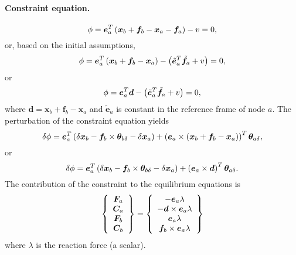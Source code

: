 \documentclass[10pt,fleqn,subeqn]{report}
\newcommand{\T}[1]{\bm{#1}}
\begin{document}
\paragraph{Constraint equation.}
\begin{equation}
	\phi = \T{e}_a^T \plbr{\T{x}_b + \T{f}_b - \T{x}_a - \T{f}_a} - v = 0 ,
\end{equation}
or, based on the initial assumptions,
\begin{equation}
	\phi = \T{e}_a^T \plbr{\T{x}_b + \T{f}_b - \T{x}_a}
		- \plbr{\tilde{\T{e}}_a^T \tilde{\T{f}}_a + v} = 0 ,
\end{equation}
or
\begin{equation}
	\phi = \T{e}_a^T \T{d}
		- \plbr{\tilde{\T{e}}_a^T \tilde{\T{f}}_a + v} = 0 ,
\end{equation}
where $\T{d}=\T{x}_b + \T{f}_b - \T{x}_a$ 
and $\tilde{\T{e}}_a$ is constant in the reference frame of node $a$.
The perturbation of the constraint equation yields
\begin{equation}
	\delta\phi = 
		\T{e}_a^T \plbr{\delta\T{x}_b
		- \T{f}_b\times\T{\theta}_{b\delta}
		- \delta\T{x}_a
		} + \plbr{\T{e}_a \times \plbr{
			\T{x}_b + \T{f}_b - \T{x}_a
		}}^T \T{\theta}_{a\delta} ,
\end{equation}
or
\begin{equation}
	\delta\phi = 
		\T{e}_a^T \plbr{\delta\T{x}_b
		- \T{f}_b\times\T{\theta}_{b\delta}
		- \delta\T{x}_a
		} + \plbr{\T{e}_a \times \T{d}}^T \T{\theta}_{a\delta} .
\end{equation}
The contribution of the constraint to the equilibrium equations is
\begin{equation}
	\cubr{\cvvect{
		\T{F}_a \\
		\T{C}_a \\
		\T{F}_b \\
		\T{C}_b
	}} = \cubr{\cvvect{
		- \T{e}_a \lambda \\
		- \T{d} \times \T{e}_a \lambda \\
		\T{e}_a \lambda \\
		\T{f}_b \times \T{e}_a \lambda
	}}
\end{equation}
where $\lambda$ is the reaction force (a scalar).
\end{document}
